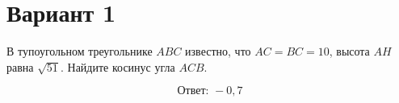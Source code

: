 \documentclass[12pt,a4paper]{article}
\begin{document}
\section*{Вариант 1}

В тупоугольном треугольнике \(ABC\) известно, что
\(AC=BC=10\), высота \(AH\) равна \(\sqrt{51}\).
Найдите косинус угла \(ACB\).

\begin{center}\figIsoscelesObtuse\end{center}

\[
\boxed{\text{Ответ: }-0{,}7}
\]
\end{document}
